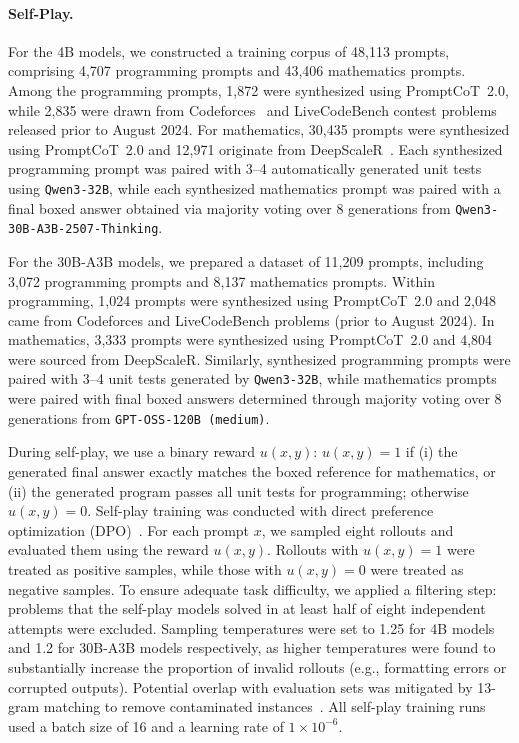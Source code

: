 \paragraph{Self-Play.} 
For the 4B models, we constructed a training corpus of 48,113 prompts, comprising 4,707 programming prompts and 43,406 mathematics prompts. 
Among the programming prompts, 1,872 were synthesized using PromptCoT~2.0, while 2,835 were drawn from Codeforces~\citep{penedo2025codeforces} and LiveCodeBench contest problems released prior to August 2024. 
For mathematics, 30,435 prompts were synthesized using PromptCoT~2.0 and 12,971 originate from DeepScaleR~\citep{deepscaler2025}. 
Each synthesized programming prompt was paired with 3–4 automatically generated unit tests using \texttt{Qwen3-32B}, while each synthesized mathematics prompt was paired with a final boxed answer obtained via majority voting over 8 generations from \texttt{Qwen3-30B-A3B-2507-Thinking}.

For the 30B-A3B models, we prepared a dataset of 11,209 prompts, including 3,072 programming prompts and 8,137 mathematics prompts. 
Within programming, 1,024 prompts were synthesized using PromptCoT~2.0 and 2,048 came from Codeforces and LiveCodeBench problems (prior to August 2024). 
In mathematics, 3,333 prompts were synthesized using PromptCoT~2.0 and 4,804 were sourced from DeepScaleR. 
Similarly, synthesized programming prompts were paired with 3–4 unit tests generated by \texttt{Qwen3-32B}, while mathematics prompts were paired with final boxed answers determined through majority voting over 8 generations from \texttt{GPT-OSS-120B (medium)}.

During self-play, we use a binary reward $u(x,y)$: $u(x,y)=1$ if (i) the generated final answer exactly matches the boxed reference for mathematics, or (ii) the generated program passes all unit tests for programming; otherwise $u(x,y)=0$. 
Self-play training was conducted with direct preference optimization (DPO)~\citep{rafailov2023direct}.  
For each prompt $x$, we sampled eight rollouts and evaluated them using the reward $u(x,y)$.  
Rollouts with $u(x,y)=1$ were treated as positive samples, while those with $u(x,y)=0$ were treated as negative samples.  
To ensure adequate task difficulty, we applied a filtering step: problems that the self-play models solved in at least half of eight independent attempts were excluded. 
Sampling temperatures were set to 1.25 for 4B models and 1.2 for 30B-A3B models respectively, as higher temperatures were found to substantially increase the proportion of invalid rollouts (e.g., formatting errors or corrupted outputs). 
Potential overlap with evaluation sets was mitigated by 13-gram matching to remove contaminated instances~\citep{yang2024qwen2_5}. 
All self-play training runs used a batch size of 16 and a learning rate of $1 \times 10^{-6}$. 

